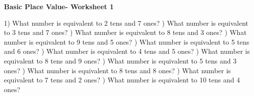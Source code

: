 \documentclass{article}%
\begin{document}
\newline%
\newline%
\newline%
\pagebreak%
\large%
\begin{center}%
\textbf{Basic Place Value- Worksheet 1}%
\newline%
\newline%
\newline%
\end{center} \normalsize%
1) What number is equivalent to 2 tens and 7 ones?%
\newline%
\newline%
) What number is equivalent to 3 tens and 7 ones?%
\newline%
\newline%
) What number is equivalent to 8 tens and 3 ones?%
\newline%
\newline%
) What number is equivalent to 9 tens and 5 ones?%
\newline%
\newline%
) What number is equivalent to 5 tens and 6 ones?%
\newline%
\newline%
) What number is equivalent to 4 tens and 5 ones?%
\newline%
\newline%
) What number is equivalent to 8 tens and 9 ones?%
\newline%
\newline%
) What number is equivalent to 5 tens and 3 ones?%
\newline%
\newline%
) What number is equivalent to 8 tens and 8 ones?%
\newline%
\newline%
) What number is equivalent to 7 tens and 2 ones?%
\newline%
\newline%
) What number is equivalent to 10 tens and 4 ones?%
\newline%
\end{document}
